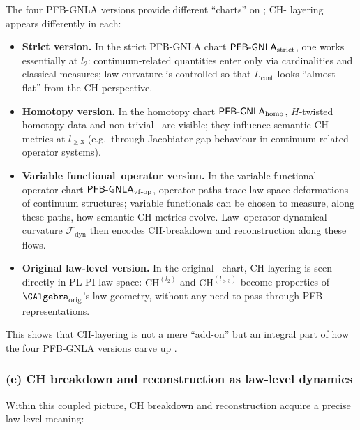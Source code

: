 \documentclass[11pt]{book}
\theoremstyle{plain}
\theoremstyle{definition}
\begin{document}
The four PFB-GNLA versions provide different “charts” on \GZGMS; CH-
layering appears differently in each:

\begin{itemize}
  \item \textbf{Strict version.}
        In the strict PFB-GNLA chart
        $\mathsf{PFB\text- GNLA}_{\mathrm{strict}}$, one works
        essentially at $l_2$: continuum-related quantities enter only
        via cardinalities and classical measures; law-curvature is
        controlled so that $L_{\mathrm{cont}}$ looks “almost flat”
        from the CH perspective.
  \item \textbf{Homotopy version.}
        In the homotopy chart
        $\mathsf{PFB\text- GNLA}_{\mathrm{homo}}$, $H$-twisted
        homotopy data and non-trivial \GZLCurv\ are visible; they
        influence semantic CH metrics at $l_{\ge3}$ (e.g.\ through
        Jacobiator-gap behaviour in continuum-related operator
        systems).
  \item \textbf{Variable functional--operator version.}
        In the variable functional--operator chart
        $\mathsf{PFB\text- GNLA}_{\mathrm{vf\text- op}}$, operator
        paths trace law-space deformations of continuum structures;
        variable functionals can be chosen to measure, along these
        paths, how semantic CH metrics evolve. Law--operator dynamical
        curvature $\mathcal{F}_{\mathrm{dyn}}$ then encodes CH-breakdown
        and reconstruction along these flows.
  \item \textbf{Original law-level version.}
        In the original \GAlgebra\ chart, CH-layering is seen directly
        in PL-PI law-space: $\mathrm{CH}^{(l_2)}$ and
        $\mathrm{CH}^{(l_{\ge3})}$ become properties of
        $\GAlgebra_{\mathrm{orig}}$’s law-geometry, without any need
        to pass through PFB representations.
\end{itemize}

This shows that CH-layering is not a mere “add-on” but an integral part
of how the four PFB-GNLA versions carve up \GZGMS.



\subsubsection*{(e) CH breakdown and reconstruction as law-level dynamics}

Within this coupled picture, CH breakdown and reconstruction acquire a
precise law-level meaning:
\end{document}
